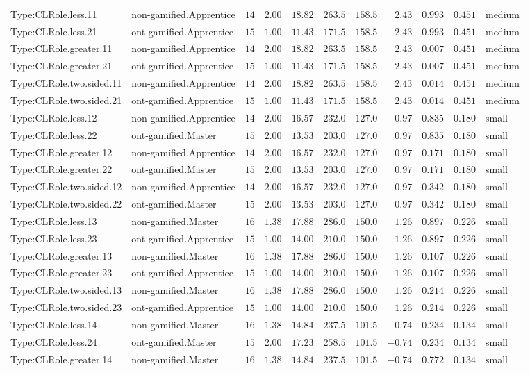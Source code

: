 \documentclass[6pt,a4paper]{article}
\begin{document}
{\begin{longtable}{llrrrrrrrrl}
Type:CLRole.less.11&non-gamified.Apprentice&$14$&$2.00$&$18.82$&$ 263.5$&$158.5$&$ 2.43$&$0.993$&$0.451$&medium\tabularnewline
Type:CLRole.less.21&ont-gamified.Apprentice&$15$&$1.00$&$11.43$&$ 171.5$&$158.5$&$ 2.43$&$0.993$&$0.451$&medium\tabularnewline
Type:CLRole.greater.11&non-gamified.Apprentice&$14$&$2.00$&$18.82$&$ 263.5$&$158.5$&$ 2.43$&$0.007$&$0.451$&medium\tabularnewline
Type:CLRole.greater.21&ont-gamified.Apprentice&$15$&$1.00$&$11.43$&$ 171.5$&$158.5$&$ 2.43$&$0.007$&$0.451$&medium\tabularnewline
Type:CLRole.two.sided.11&non-gamified.Apprentice&$14$&$2.00$&$18.82$&$ 263.5$&$158.5$&$ 2.43$&$0.014$&$0.451$&medium\tabularnewline
Type:CLRole.two.sided.21&ont-gamified.Apprentice&$15$&$1.00$&$11.43$&$ 171.5$&$158.5$&$ 2.43$&$0.014$&$0.451$&medium\tabularnewline
Type:CLRole.less.12&non-gamified.Apprentice&$14$&$2.00$&$16.57$&$ 232.0$&$127.0$&$ 0.97$&$0.835$&$0.180$&small\tabularnewline
Type:CLRole.less.22&ont-gamified.Master&$15$&$2.00$&$13.53$&$ 203.0$&$127.0$&$ 0.97$&$0.835$&$0.180$&small\tabularnewline
Type:CLRole.greater.12&non-gamified.Apprentice&$14$&$2.00$&$16.57$&$ 232.0$&$127.0$&$ 0.97$&$0.171$&$0.180$&small\tabularnewline
Type:CLRole.greater.22&ont-gamified.Master&$15$&$2.00$&$13.53$&$ 203.0$&$127.0$&$ 0.97$&$0.171$&$0.180$&small\tabularnewline
Type:CLRole.two.sided.12&non-gamified.Apprentice&$14$&$2.00$&$16.57$&$ 232.0$&$127.0$&$ 0.97$&$0.342$&$0.180$&small\tabularnewline
Type:CLRole.two.sided.22&ont-gamified.Master&$15$&$2.00$&$13.53$&$ 203.0$&$127.0$&$ 0.97$&$0.342$&$0.180$&small\tabularnewline
Type:CLRole.less.13&non-gamified.Master&$16$&$1.38$&$17.88$&$ 286.0$&$150.0$&$ 1.26$&$0.897$&$0.226$&small\tabularnewline
Type:CLRole.less.23&ont-gamified.Apprentice&$15$&$1.00$&$14.00$&$ 210.0$&$150.0$&$ 1.26$&$0.897$&$0.226$&small\tabularnewline
Type:CLRole.greater.13&non-gamified.Master&$16$&$1.38$&$17.88$&$ 286.0$&$150.0$&$ 1.26$&$0.107$&$0.226$&small\tabularnewline
Type:CLRole.greater.23&ont-gamified.Apprentice&$15$&$1.00$&$14.00$&$ 210.0$&$150.0$&$ 1.26$&$0.107$&$0.226$&small\tabularnewline
Type:CLRole.two.sided.13&non-gamified.Master&$16$&$1.38$&$17.88$&$ 286.0$&$150.0$&$ 1.26$&$0.214$&$0.226$&small\tabularnewline
Type:CLRole.two.sided.23&ont-gamified.Apprentice&$15$&$1.00$&$14.00$&$ 210.0$&$150.0$&$ 1.26$&$0.214$&$0.226$&small\tabularnewline
Type:CLRole.less.14&non-gamified.Master&$16$&$1.38$&$14.84$&$ 237.5$&$101.5$&$-0.74$&$0.234$&$0.134$&small\tabularnewline
Type:CLRole.less.24&ont-gamified.Master&$15$&$2.00$&$17.23$&$ 258.5$&$101.5$&$-0.74$&$0.234$&$0.134$&small\tabularnewline
Type:CLRole.greater.14&non-gamified.Master&$16$&$1.38$&$14.84$&$ 237.5$&$101.5$&$-0.74$&$0.772$&$0.134$&small\tabularnewline

\end{longtable}}
\end{document}
